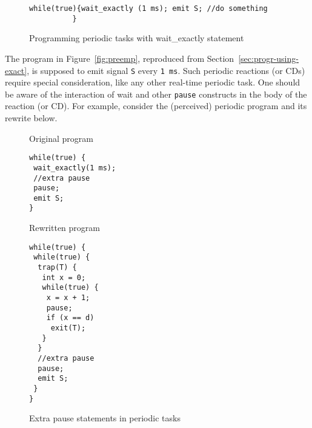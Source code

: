 


\begin{figure}[h!]
  \centering
	\vspace{-10pt}
        \begin{lstlisting}[style=sysj,basicstyle=\normalsize\ttfamily,morekeywords={emit,trap,pause,exit,wait_exactly}]
          while(true){wait_exactly (1 ms); emit S; //do something
          }
 \end{lstlisting}
  \caption{Programming periodic tasks with wait\_exactly statement}
  \label{fig:periodic}
	\vspace{-10pt}
\end{figure}

The program in Figure~\ref{fig:preemp}, reproduced from
Section~\ref{sec:progr-using-exact}, is supposed to emit signal
\texttt{S} every \texttt{1 ms}. Such periodic reactions (or CDs) require
special consideration, like any other real-time periodic task. One
should be aware of the interaction of wait and other \texttt{pause}
constructs in the body of the reaction (or CD). For example, consider
the (perceived) periodic program and its rewrite below.

\begin{figure}[h!]
  \centering
  \begin{SubFloat}{\label{pp:a}Original program}
    \centering
			\begin{lstlisting}[style=sysj,basicstyle=\normalsize\ttfamily,morekeywords={emit,trap,pause,exit,wait_exactly}]
while(true) {
 wait_exactly(1 ms);
 //extra pause
 pause;
 emit S;
}
\end{lstlisting}
\end{SubFloat}
\hspace{9pt}
  \begin{SubFloat}{\label{pp:b}Rewritten program}
			\begin{lstlisting}[style=sysj,basicstyle=\normalsize\ttfamily,morekeywords={emit,trap,pause,exit,delay}]
while(true) {
 while(true) { 
  trap(T) {
   int x = 0;
   while(true) {
    x = x + 1;
    pause;
    if (x == d)
     exit(T);
   }
  }
  //extra pause
  pause;
  emit S;
 }
}
\end{lstlisting}
  \end{SubFloat}
\caption{Extra pause statements in periodic tasks}
  \label{fig:periodic2}
\end{figure}

